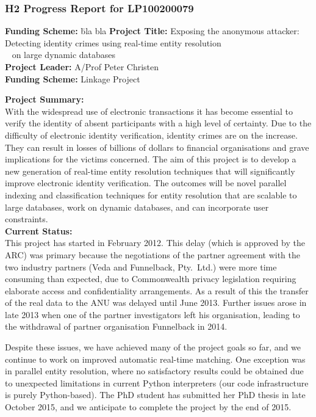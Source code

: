\documentclass[a4paper,oneside,12pt]{article}
\begin{document}
\subsubsection*{H2 Progress Report for LP100200079}

\begin{tabbing}
\textbf{Funding Scheme:} \= bla bla \kill
\textbf{Project Title:} \> Exposing the anonymous attacker: Detecting
  identity crimes using real-time entity resolution \\
~ \> on large dynamic databases \\
\textbf{Project Leader:} \> A/Prof Peter Christen \\
\textbf{Funding Scheme:} \> Linkage Project
\end{tabbing}

\noindent
{\bf Project Summary:} \\
With the widespread use of electronic transactions it has become
essential to verify the identity of absent participants with a high
level of certainty. Due to the difficulty of electronic identity
verification, identity crimes are on the increase. They can result in
losses of billions of dollars to financial organisations and grave
implications for the victims concerned. The aim of this project is to
develop a new generation of real-time entity resolution techniques
that will significantly improve electronic identity verification. The
outcomes will be novel parallel indexing and classification techniques
for entity resolution that are scalable to large databases, work on
dynamic databases, and can incorporate user constraints. \\[-2mm]

\noindent
{\bf Current Status:~} \\
This project has started in February 2012. This delay (which
is approved by the ARC) was primary because the negotiations of the
partner agreement with the two industry partners (Veda and Funnelback,
Pty.\ Ltd.) were more time consuming than expected, due to Commonwealth
privacy legislation requiring elaborate
access and confidentiality arrangements. As a result of this the
transfer of the real data to the ANU was delayed until June
2013. Further issues arose in late 2013 when one of the partner
investigators left his organisation, leading to the withdrawal of
partner organisation Funnelback in 2014.

Despite these issues, we have achieved many of the project goals so
far, and we continue to work on improved automatic real-time
matching. One exception was in parallel entity resolution, where no
satisfactory results could be obtained due to unexpected limitations in current
Python interpreters (our code infrastructure is purely Python-based).
  The PhD student has submitted her PhD thesis in late
October 2015, and we anticipate to complete the project by the end
of 2015. \\[-2mm]
\end{document}
